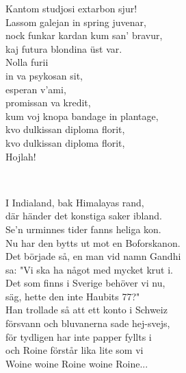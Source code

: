 \documentclass[a6paper,10pt]{article}
\begin{document}
\setlength{\oddsidemargin}{-0.47in}
\begin{center}
\end{center}
\begin{lyrics}
\small Kantom studjosi extarbon sjur!\\
Lassom galejan in spring juvenar,\\
nock funkar kardan kum san' bravur,\\
kaj futura blondina üst var.\\
Nolla furii\\
in va psykosan sit,\\
esperan v'ami,\\
promissan va kredit,\\
kum voj knopa bandage in plantage,\\
kvo dulkissan diploma florit,\\
kvo dulkissan diploma florit,\\
Hojlah!
\end{lyrics}
\vspace{-16pt}\\
\begin{center}
\end{center}
\begin{lyrics}
\small I Indialand, bak Himalayas rand,\\
där händer det konstiga saker ibland.\\
Se'n urminnes tider fanns heliga kon.\\
Nu har den bytts ut mot en Boforskanon.
\vspace{5pt}\\
Det började så, en man vid namn Gandhi\\
sa: "Vi ska ha något med mycket krut i.\\
Det som finns i Sverige behöver vi nu,\\
säg, hette den inte Haubits 77?"
\vspace{5pt}\\
Han trollade så att ett konto i Schweiz\\
försvann och bluvanerna sade hej-svejs,\\
för tydligen har inte papper fyllts i\\
och Roine förstår lika lite som vi\\
Woine woine Roine woine Roine...
\end{lyrics}
\end{document}
